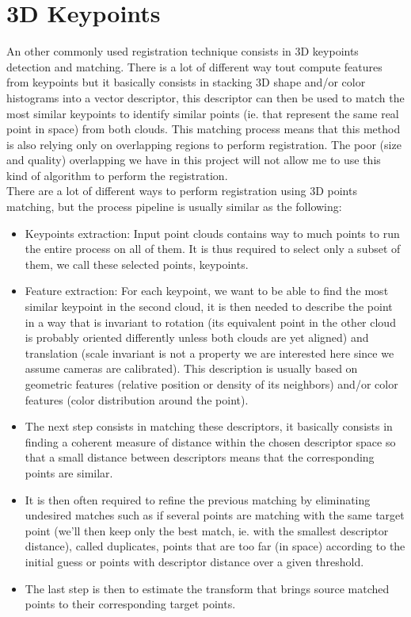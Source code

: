 \section{3D Keypoints}

An other commonly used registration technique consists in 3D keypoints detection and matching. There is a lot of different way tout compute features from keypoints but it basically consists in stacking 3D shape and/or color histograms into a vector descriptor, this descriptor can then be used to match the most similar keypoints to identify similar points (ie. that represent the same real point in space) from both clouds. This matching process means that this method is also relying only on overlapping regions to perform registration. The poor (size and quality) overlapping we have in this project will not allow me to use this kind of algorithm to perform the registration. \\
There are a lot of different ways to perform registration using 3D points matching, but the process pipeline is usually similar as the following:
\begin{itemize}
    \item Keypoints extraction: Input point clouds contains way to much points to run the entire process on all of them. It is thus required to select only a subset of them, we call these selected points, keypoints.
    \item Feature extraction: For each keypoint, we want to be able to find the most similar keypoint in the second cloud, it is then needed to describe the point in a way that is invariant to rotation (its equivalent point in the other cloud is probably oriented differently unless both clouds are yet aligned) and translation (scale invariant is not a property we are interested here since we assume cameras are calibrated). This description is usually based on geometric features (relative position or density of its neighbors) and/or color features (color distribution around the point).
    \item The next step consists in matching these descriptors, it basically consists in finding a coherent measure of distance within the chosen descriptor space so that a small distance between descriptors means that the corresponding points are similar.
    \item It is then often required to refine the previous matching by eliminating undesired matches such as if several points are matching with the same target point (we'll then keep only the best match, ie. with the smallest descriptor distance), called duplicates, points that are too far (in space) according to the initial guess or points with descriptor distance over a given threshold.
    \item The last step is then to estimate the transform that brings source matched points to their corresponding target points.
\end{itemize}

